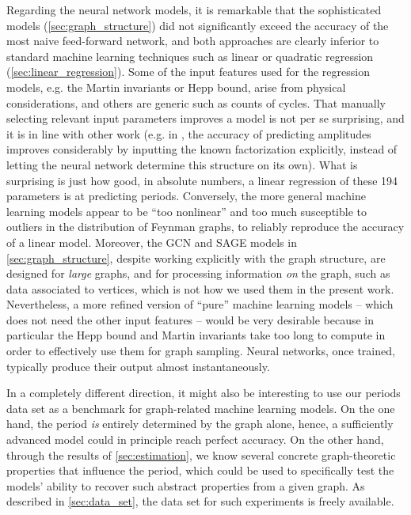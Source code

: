 \documentclass[12pt]{article}
\numberwithin{equation}{section}
\begin{document}
Regarding the neural network models, it is remarkable that the sophisticated  models (\cref{sec:graph_structure})  did not significantly exceed the accuracy of the most naive feed-forward network, and both approaches are clearly inferior to standard machine learning techniques such as linear or quadratic regression (\cref{sec:linear_regression}). Some of the input features used for the regression models, e.g. the Martin invariants or Hepp bound, arise from physical considerations, and others are generic such as counts of cycles. 
That manually selecting relevant input parameters improves a model is not per se surprising, and it is in line with other work (e.g. in \cite{maitre_oneloop_2023}, the accuracy of predicting amplitudes improves considerably by inputting the known factorization  explicitly, instead of letting the neural network determine this structure on its own). What is surprising is just how good, in absolute numbers, a linear regression of these 194  parameters is at predicting periods. Conversely, the more general machine learning models appear to be \enquote{too nonlinear} and too much susceptible to outliers in the distribution of Feynman graphs, to reliably reproduce the accuracy of a linear model. Moreover, the GCN and SAGE models in \cref{sec:graph_structure}, despite working explicitly with the graph structure, are designed for \emph{large} graphs, and for processing information \emph{on} the graph, such as data associated to vertices, which is not how we used them in the present work. Nevertheless, a more refined version of \enquote{pure} machine learning models -- which does not need the other input features -- would be very desirable because in particular the Hepp bound and Martin invariants take too long to compute in order to effectively use them for graph sampling. Neural networks, once trained, typically produce their output almost instantaneously. 



In a completely different direction,  it might also be interesting to use our periods data set as a benchmark for  graph-related machine learning models. On the one hand, the period \emph{is} entirely determined by the graph alone, hence, a sufficiently advanced model could in principle reach perfect accuracy. On the other hand, through the results of \cref{sec:estimation}, we know several concrete graph-theoretic properties that influence the period, which could be used to specifically test the models' ability to recover such abstract properties from a given graph. As described in \cref{sec:data_set}, the data set for such experiments is freely available. 
\end{document}
